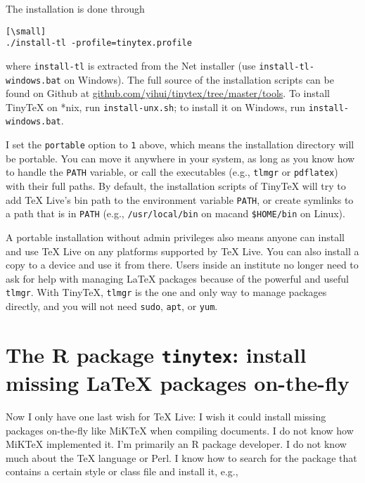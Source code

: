 \documentclass{ltugboat}
\def\macOS{mac\acro{OS}}
\def\tinytex{\texttt{tinytex}}
\begin{document}
The installation is done through

\begin{verbatim}[\small]
./install-tl -profile=tinytex.profile
\end{verbatim}

where \texttt{install-tl} is extracted from the Net installer (use
\texttt{install-tl-windows.bat} on Windows). The full source of the
installation scripts can be found on Github at
\url{github.com/yihui/tinytex/tree/master/tools}. To install
TinyTeX on *nix, run \texttt{install-unx.sh}; to install it on Windows,
run \texttt{install-windows.bat}.

I set the \texttt{portable} option to \texttt{1} above, which means the
installation directory will be portable. You can move it anywhere in
your system, as long as you know how to handle the \texttt{PATH}
variable, or call the executables (e.g., \texttt{tlmgr} or
\texttt{pdflatex}) with their full paths. By default, the installation
scripts of TinyTeX will try to add \TeX{} Live's bin path to the
environment variable \texttt{PATH}, or create symlinks to a path that is
in \texttt{PATH} (e.g., \texttt{/usr/local/bin} on \macOS and
\texttt{\$HOME/bin} on Linux).

A portable installation without admin privileges also means anyone can
install and use \TeX{} Live on any platforms supported by \TeX{} Live. You can
also install a copy to a  device and use it from there. Users inside
an institute no longer need to ask for  help with managing \LaTeX{}
packages because of the powerful and useful \texttt{tlmgr}. With
TinyTeX, \texttt{tlmgr} is the one and only way to manage packages
directly, and you will not need \texttt{sudo}, \texttt{apt}, or
\texttt{yum}.

\hypertarget{the-r-package-tinytex-install-missing-latex-packages-on-the-fly}{%
\section{\texorpdfstring{The R package \tinytex{}: install missing
\LaTeX{} packages
on-the-fly}{The R package tinytex: install missing \LaTeX{} packages on-the-fly}}\label{the-r-package-tinytex-install-missing-latex-packages-on-the-fly}}

Now I only have one last wish for \TeX{} Live: I wish it could install
missing packages on-the-fly like MiKTeX when compiling documents. I do
not know how MiKTeX implemented it. I'm primarily an R \cite{R-base}
package developer. I do not know much about the \TeX{} language or Perl. I
know how to search for the package that contains a certain style or
class file and install it, e.g.,
\end{document}
